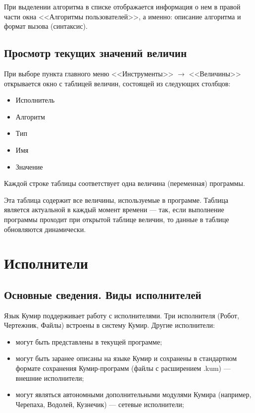 При выделении алгоритма в списке отображается информация о нем в правой части окна <<Алгоритмы пользователей>>, а именно: описание алгоритма и формат вызова (синтаксис).

\subsection{Просмотр текущих значений величин}
\label{debugtable}

При выборе пункта главного меню <<Инструменты>> $\to$ <<Величины>> открывается окно с таблицей величин, состоящей из следующих столбцов:
\begin{itemize}
\item Исполнитель
\item Алгоритм
\item Тип
\item Имя
\item Значение
\end{itemize}

Каждой строке таблицы соответствует одна величина (переменная) программы.

Эта таблица содержит все величины, используемые в программе. Таблица является актуальной в каждый момент времени --- так, если выполнение программы проходит при открытой таблице величин, то данные в таблице обновляются динамически.

\section{Исполнители}

\subsection{Основные сведения. Виды исполнителей}

Язык Кумир поддерживает работу с исполнителями. Три исполнителя (Робот, Чертежник, Файлы) встроены в систему Кумир. Другие исполнители:
\begin{itemize}
\item могут быть представлены в текущей программе;
\item могут быть заранее описаны на языке Кумир и сохранены в стандартном формате сохранения Кумир-прог\-рамм (файлы с расширением .kum) --- внешние исполнители;
\item могут являться автономными дополнительными модулями Кумира (например, Черепаха, Водолей, Кузнечик) --- сетевые исполнители;
\end{itemize}

